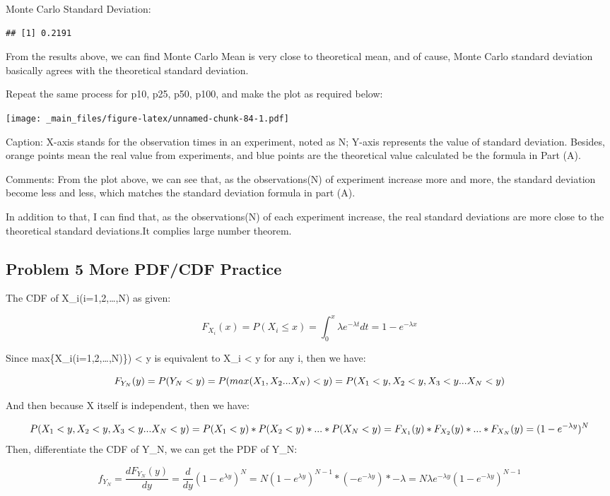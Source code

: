 \documentclass[
]{article}
\begin{document}
Monte Carlo Standard Deviation:

\begin{verbatim}
## [1] 0.2191
\end{verbatim}

From the results above, we can find Monte Carlo Mean is very close to theoretical mean, and of cause, Monte Carlo standard deviation basically agrees with the theoretical standard deviation.

Repeat the same process for p10, p25, p50, p100, and make the plot as required below:

\texttt{[image: \_main\_files/figure-latex/unnamed-chunk-84-1.pdf]}

Caption: X-axis stands for the observation times in an experiment, noted as N; Y-axis represents the value of standard deviation. Besides, orange points mean the real value from experiments, and blue points are the theoretical value calculated be the formula in Part (A).

Comments: From the plot above, we can see that, as the observations(N) of experiment increase more and more, the standard deviation become less and less, which matches the standard deviation formula in part (A).

In addition to that, I can find that, as the observations(N) of each experiment increase, the real standard deviations are more close to the theoretical standard deviations.It complies large number theorem.

\hypertarget{problem-5-more-pdfcdf-practice}{%
\subsection{Problem 5 More PDF/CDF Practice}\label{problem-5-more-pdfcdf-practice}}

The CDF of X\_i(i=1,2,\ldots,N) as given:

\[
F_{X_i}(x) = P(X_i≤x) = \int_{0}^{x} \lambda e^{-\lambda t}dt = 1- e^{-\lambda x}
\]

Since max\{X\_i(i=1,2,\ldots,N)\}) \textless{} y is equivalent to X\_i \textless{} y for any i, then we have:

\[
F_{Y_N}(y) = P(Y_N < y) \\= P(max(X_1,X_2...X_N)<y) \\= P(X_1<y,X_2<y,X_3<y...X_N<y)
\]

And then because X itself is independent, then we have:

\[
P(X_1<y,X_2<y,X_3<y...X_N<y) \\= P(X_1<y) *P(X_2<y) *...*P(X_N<y) \\= F_{X_1}(y)*F_{X_2}(y)*...*F_{X_N}(y) \\= (1- e^{-\lambda y})^N
\]
Then, differentiate the CDF of Y\_N, we can get the PDF of Y\_N:

\[
f_{Y_N} = \frac {dF_{Y_N}(y)}{dy} = \frac {d}{dy}(1-e^{\lambda y})^N = N(1-e^{\lambda y})^{N-1}*(-e^{-\lambda y})*-\lambda = N\lambda e^{-\lambda y}(1-e^{-\lambda y})^{N-1}
\]

  
\end{document}
